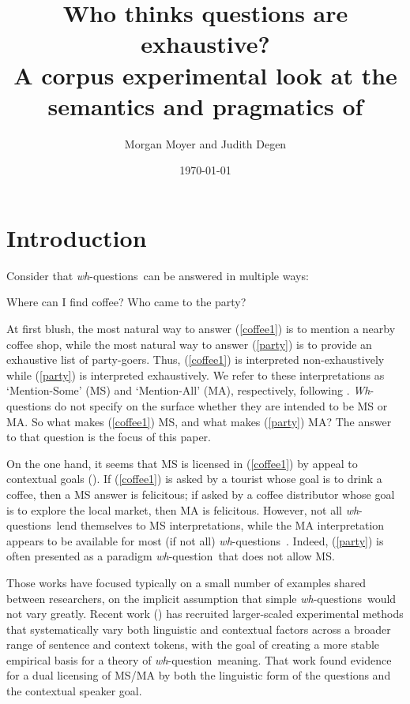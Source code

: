 \documentclass[12pt,letterpaper,table,svgnames,dvipsnames]{article}
\title{Who thinks questions are exhaustive? \\ A corpus experimental look at the semantics and pragmatics of \whqs}
\author{Morgan Moyer and Judith Degen}
\date{\today}
\newcommand{\whq}{\emph{wh}-question~}
\newcommand{\whqs}{\emph{wh}-questions~}
\begin{document}
\maketitle

\section{Introduction}

Consider that \whqs can be answered in multiple ways:
\begin{exe}
    \ex {}
    \begin{xlist}
        \ex Where can I find coffee? \label{coffee1}
        \ex Who came to the party? \label{party}
    \end{xlist}
\end{exe}
At first blush, the most natural way to answer (\ref{coffee1}) is to mention a nearby coffee shop, while the most natural way to answer (\ref{party}) is to provide an exhaustive list of party-goers. Thus, (\ref{coffee1}) is interpreted non-exhaustively while (\ref{party}) is interpreted exhaustively. We refer to these interpretations as `Mention-Some' (MS) and `Mention-All' (MA), respectively, following . \emph{Wh}-questions do not specify on the surface whether they are intended to be MS or MA. So what makes (\ref{coffee1}) MS, and what makes (\ref{party}) MA? The answer to that question is the focus of this paper.

On the one hand, it seems that MS is licensed in (\ref{coffee1}) by appeal to contextual goals (\cite{groenstok1982,groenstok1984}). If (\ref{coffee1}) is asked by a tourist whose goal is to drink a coffee, then a MS answer is felicitous; if asked by a coffee distributor whose goal is to explore the local market, then MA is felicitous. However, not all \whqs lend themselves to MS interpretations, while the MA interpretation appears to be available for most (if not all) \whqs. Indeed, (\ref{party}) is often presented as a paradigm \whq that does not allow MS.

Those works have focused typically on a small number of examples shared between researchers, on the implicit assumption that simple \whqs would not vary greatly. Recent work (\cite{moyersyrett2019,moyer2020}) has recruited larger-scaled experimental methods that systematically vary both linguistic and contextual factors across a broader range of sentence and context tokens, with the goal of creating a more stable empirical basis for a theory of \whq meaning. That work found evidence for a dual licensing of MS/MA by both the linguistic form of the questions and the contextual speaker goal. 
\end{document}
